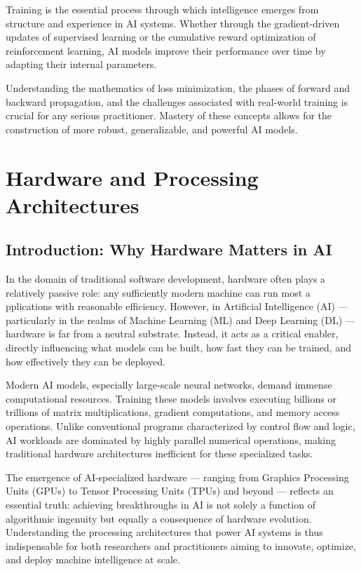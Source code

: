 \documentclass[openany]{book}
\begin{document}
Training is the essential process through which intelligence emerges from 
structure and experience in AI systems. Whether through the gradient-driven 
updates of supervised learning or the cumulative reward optimization of 
reinforcement learning, AI models improve their performance over time by 
adapting their internal parameters.

Understanding the mathematics of loss minimization, the phases of forward and 
backward propagation, and the challenges associated with real-world training is 
crucial for any serious practitioner. Mastery of these concepts allows for the 
construction of more robust, generalizable, and powerful AI models.

\chapter{Hardware and Processing Architectures}

\section{Introduction: Why Hardware Matters in AI}

In the domain of traditional software development, hardware often plays a 
relatively passive role: any sufficiently modern machine can run most a
pplications with reasonable efficiency. However, in Artificial Intelligence (AI) 
— particularly in the realms of Machine Learning (ML) and Deep Learning (DL) — 
hardware is far from a neutral substrate. Instead, it acts as a critical 
enabler, directly influencing what models can be built, how fast they can be 
trained, and how effectively they can be deployed.

Modern AI models, especially large-scale neural networks, demand immense 
computational resources. Training these models involves executing billions or 
trillions of matrix multiplications, gradient computations, and memory access 
operations. Unlike conventional programs characterized by control flow and 
logic, AI workloads are dominated by highly parallel numerical operations, 
making traditional hardware architectures inefficient for these specialized 
tasks.

The emergence of AI-specialized hardware — ranging from Graphics Processing 
Units (GPUs) to Tensor Processing Units (TPUs) and beyond — reflects an 
essential truth: achieving breakthroughs in AI is not solely a function of 
algorithmic ingenuity but equally a consequence of hardware evolution. 
Understanding the processing architectures that power AI systems is thus 
indispensable for both researchers and practitioners aiming to innovate, 
optimize, and deploy machine intelligence at scale.
\end{document}
